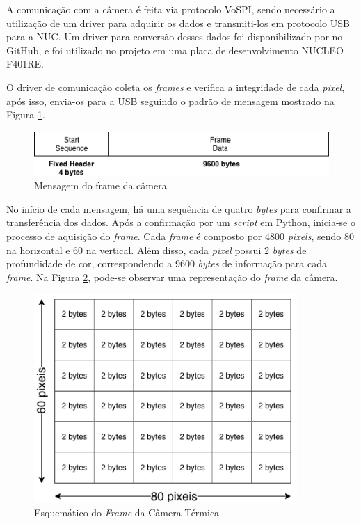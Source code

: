 		 A comunicação com a câmera é feita via protocolo VoSPI, sendo necessário a utilização de um driver para adquirir os dados e transmiti-los em protocolo USB para a NUC. Um driver para conversão desses dados foi disponibilizado por  no GitHub, e foi utilizado no projeto em uma placa de desenvolvimento NUCLEO F401RE.
		
		
		O driver de comunicação coleta os \textit{frames} e verifica a integridade de cada \textit{pixel}, após isso, envia-os para a USB seguindo o padrão de mensagem mostrado na Figura \ref{fig:framemsg}.
		    
		\begin{figure}[!ht]
		   \centering
		   \includegraphics[width=14cm]{Figures/frame_msg.png}
		   \caption{Mensagem do frame da câmera}
		   \label{fig:framemsg}
		\end{figure}
	
	    No início de cada mensagem, há uma sequência de quatro \textit{bytes} para confirmar a transferência dos dados. Após a confirmação por um \textit{script} em Python, inicia-se o processo de aquisição do \textit{frame}. Cada \textit{frame} é composto por 4800 \textit{pixels}, sendo 80 na horizontal e 60 na vertical. Além disso, cada \textit{pixel} possui 2 \textit{bytes} de profundidade de cor, correspondendo a 9600 \textit{bytes} de informação para cada \textit{frame}. Na Figura \ref{fig:frame_esque}, pode-se observar uma representação do \textit{frame} da câmera.
	    
	
		\begin{figure}[!ht]
		   \centering
		   \includegraphics[width=10cm]{Figures/frame_esque.png}
		   \caption{Esquemático do \textit{Frame} da Câmera Térmica}
		   \label{fig:frame_esque}
		\end{figure}
		
